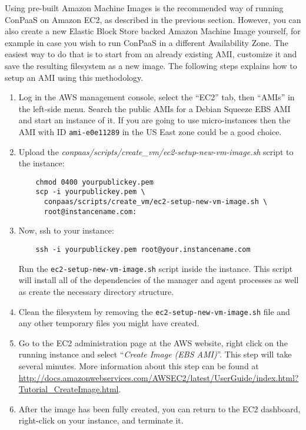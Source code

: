 \documentclass[10pt]{article}
\begin{document}
Using pre-built Amazon Machine Images is the recommended way of running ConPaaS
on Amazon EC2, as described in the previous section. However, you can also
create a new Elastic Block Store backed Amazon Machine Image yourself, for example
in case you wish to run ConPaaS in a different Availability Zone.
The easiest way to do that is to start from an already existing AMI, customize
it and save the resulting filesystem as a new image. The following steps explains
how to setup an AMI using this methodology.

\begin{enumerate}
\item Log in the AWS management console, select the ``EC2'' tab, then ``AMIs''
in the left-side menu. Search the public AMIs for a Debian Squeeze EBS AMI and
start an instance of it. If you are going to use micro-instances then the AMI
with ID \verb+ami-e0e11289+ in the US East zone could be a good choice.

\item Upload the \textit{conpaas/scripts/create\_vm/ec2-setup-new-vm-image.sh} script to the instance:
  \begin{verbatim}
    chmod 0400 yourpublickey.pem
    scp -i yourpublickey.pem \
      conpaas/scripts/create_vm/ec2-setup-new-vm-image.sh \
      root@instancename.com:
  \end{verbatim}

\item Now, ssh to your instance:
  \begin{verbatim}
    ssh -i yourpublickey.pem root@your.instancename.com
  \end{verbatim}
  Run the \verb+ec2-setup-new-vm-image.sh+ script inside the instance.
  This script will install all of the dependencies of the manager and
  agent processes as well as create the necessary directory structure.

\item Clean the filesystem by removing the
  \verb+ec2-setup-new-vm-image.sh+ file and any other temporary files you might
  have created.

\item Go to the EC2 administration page at the AWS website, right
  click on the running instance and select ``\emph{Create Image (EBS
    AMI)}''.  This step will take several minutes. More information about this step
 can be found at
  \url{http://docs.amazonwebservices.com/AWSEC2/latest/UserGuide/index.html?Tutorial\_CreateImage.html}.

\item After the image has been fully created, you can return to the
  EC2 dashboard, right-click on your instance, and terminate it.
\end{enumerate}
\end{document}
